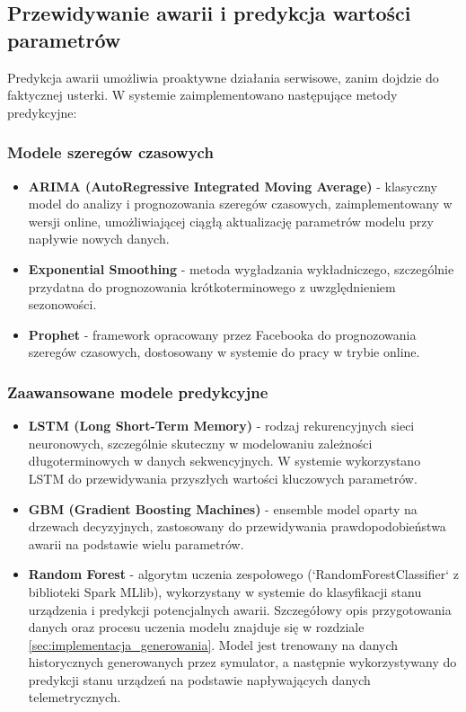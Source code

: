 \subsection{Przewidywanie awarii i predykcja wartości parametrów}
\label{subsec:predykcja_awarii}

Predykcja awarii umożliwia proaktywne działania serwisowe, zanim dojdzie do faktycznej usterki. W systemie zaimplementowano następujące metody predykcyjne:

\subsubsection{Modele szeregów czasowych}
\label{subsubsec:szeregi_czasowe}

\begin{itemize}
    \item \textbf{ARIMA (AutoRegressive Integrated Moving Average)} - klasyczny model do analizy i prognozowania szeregów czasowych, zaimplementowany w wersji online, umożliwiającej ciągłą aktualizację parametrów modelu przy napływie nowych danych.
    \item \textbf{Exponential Smoothing} - metoda wygładzania wykładniczego, szczególnie przydatna do prognozowania krótkoterminowego z uwzględnieniem sezonowości.
    \item \textbf{Prophet} - framework opracowany przez Facebooka do prognozowania szeregów czasowych, dostosowany w systemie do pracy w trybie online.
\end{itemize}

\subsubsection{Zaawansowane modele predykcyjne}
\label{subsubsec:modele_predykcyjne}

\begin{itemize}
    \item \textbf{LSTM (Long Short-Term Memory)} - rodzaj rekurencyjnych sieci neuronowych, szczególnie skuteczny w modelowaniu zależności długoterminowych w danych sekwencyjnych. W systemie wykorzystano LSTM do przewidywania przyszłych wartości kluczowych parametrów.
    \item \textbf{GBM (Gradient Boosting Machines)} - ensemble model oparty na drzewach decyzyjnych, zastosowany do przewidywania prawdopodobieństwa awarii na podstawie wielu parametrów.
    \item \textbf{Random Forest} - algorytm uczenia zespołowego (`RandomForestClassifier` z biblioteki Spark MLlib), wykorzystany w systemie do klasyfikacji stanu urządzenia i predykcji potencjalnych awarii. Szczegółowy opis przygotowania danych oraz procesu uczenia modelu znajduje się w rozdziale \ref{sec:implementacja_generowania}. Model jest trenowany na danych historycznych generowanych przez symulator, a następnie wykorzystywany do predykcji stanu urządzeń na podstawie napływających danych telemetrycznych.
\end{itemize}

